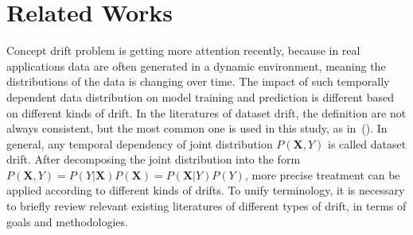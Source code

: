 \documentclass[twoside,11pt]{article}
\begin{document}

\section{Related Works}
Concept drift problem is getting more attention recently, because in real applications data are often generated in a dynamic environment, meaning the distributions of the data is changing over time. The impact of such temporally dependent data distribution on model training and prediction is different based on different kinds of drift. In the literatures of dataset drift, the definition are not always consistent, but the most common one is used in this study, as in~(\cite{moreno2012unifying}). In general, any temporal dependency of joint distribution $P(\bm {X}, Y)$ is called dataset drift. After decomposing the joint distribution into the form $P(\bm{X}, Y) = P(Y|\bm{X})P(\bm {X})=P(\bm {X}| {Y})P(Y)$, more precise treatment can be applied according to different kinds of drifts. To unify terminology, it is necessary to briefly review relevant existing literatures of different types of drift, in terms of goals and methodologies. 
\end{document}
